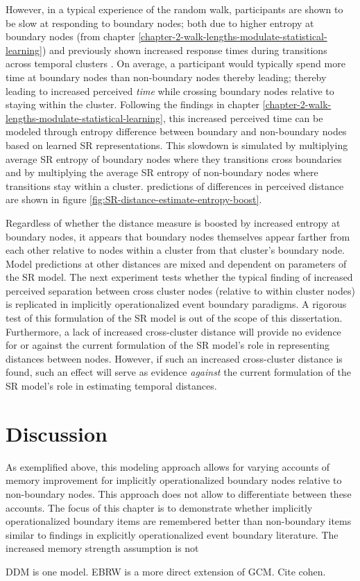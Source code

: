 However, in a typical experience of the random walk, participants are shown to be slow at responding to boundary nodes; both due to higher entropy at boundary nodes (from chapter \ref{chapter-2-walk-lengths-modulate-statistical-learning}) and previously shown increased response times during transitions across temporal clusters \cite{lynn2020abstract,kahn2018network}. On average, a participant would typically spend more time at boundary nodes than non-boundary nodes thereby leading; thereby leading to increased perceived \textit{time} while crossing boundary nodes relative to staying within the cluster. Following the findings in chapter \ref{chapter-2-walk-lengths-modulate-statistical-learning}, this increased perceived time can be modeled through entropy difference between boundary and non-boundary nodes based on learned SR representations. This slowdown is simulated by multiplying average SR entropy of boundary nodes where they transitions cross boundaries and by multiplying the average SR entropy of non-boundary nodes where transitions stay within a cluster. predictions of differences in perceived distance are shown in figure \ref{fig:SR-distance-estimate-entropy-boost}.


Regardless of whether the distance measure is boosted by increased entropy at boundary nodes, it appears that boundary nodes themselves appear farther from each other relative to nodes within a cluster from that cluster's boundary node. Model predictions at other distances are mixed and dependent on parameters of the SR model. The next experiment tests whether the typical finding of increased perceived separation between cross cluster nodes (relative to within cluster nodes) is replicated in implicitly operationalized event boundary paradigms. A rigorous test of this formulation of the SR model is out of the scope of this dissertation. Furthermore, a lack of increased cross-cluster distance will provide no evidence for or against the current formulation of the SR model's role in representing distances between nodes. However, if such an increased cross-cluster distance is found, such an effect will serve as evidence \textit{against} the current formulation of the SR model's role in estimating temporal distances. 




\section{Discussion}

As exemplified above, this modeling approach allows for varying accounts of memory improvement for implicitly operationalized boundary nodes relative to non-boundary nodes. This approach does not allow to differentiate between these accounts. The focus of this chapter is to demonstrate whether implicitly operationalized boundary items are remembered better than non-boundary items similar to findings in explicitly operationalized event boundary literature. The increased memory strength assumption is not

DDM is one model. EBRW is a more direct extension of GCM. Cite cohen. 